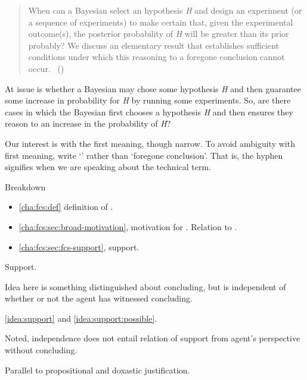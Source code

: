 \begin{note}
  \begin{quote}
    When can a Bayesian select an hypothesis \emph{H} and design an experiment (or a sequence of experiments) to make certain that, given the experimental outcome(s), the posterior probability of \emph{H} will be greater than its prior probably?
    We discuss an elementary result that establishes sufficient conditions under which this reasoning to a foregone conclusion cannot occur.%
    \mbox{ }\hfill\mbox{(\citeyear[1228]{Kadane:1996vu})}
  \end{quote}

  At issue is whether a Bayesian may chose some hypothesis \emph{H} and then guarantee some increase in probability for \emph{H} by running some experiments.
  So, are there cases in which the Bayesian first chooses a hypothesis \emph{H} and then ensures they reason to an increase in the probability of \emph{H}?
\end{note}

\begin{note}
  Our interest is with the first meaning, though narrow.
  To avoid ambiguity with first meaning, write `' rather than `foregone conclusion'.
  That is, the hyphen signifies when we are speaking about the technical term.
\end{note}

\begin{note}
  Breakdown
  \begin{itemize}
  \item
    \autoref{cha:fcs:def} definition of .
  \item
    \autoref{cha:fcs:sec:broad-motivation}, motivation for .
    Relation to .
  \item
    \autoref{cha:fcs:sec:fcs-support}, support.
  \end{itemize}
\end{note}

\begin{note}
  Support.

  Idea here is something distinguished about concluding, but is independent of whether or not the agent has witnessed concluding.

  \autoref{idea:support} and \autoref{idea:support:possible}.

  Noted, independence does not entail relation of support from agent's perspective without concluding.

  Parallel to propositional and doxastic justification.
\end{note}


